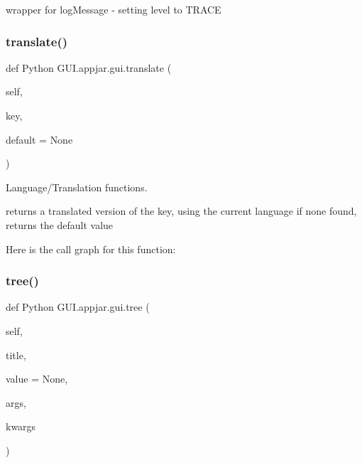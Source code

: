 \begin{DoxyVerb}
\begin{DoxyVerb}wrapper for logMessage - setting level to TRACE \end{DoxyVerb}
 \mbox{\label{class_python_01_g_u_i_1_1appjar_1_1gui_ad4fafaf0c6edbbcdee2a677608cd6fca}} 
\subsubsection{\texorpdfstring{translate()}{translate()}}
{\footnotesize\ttfamily def Python G\+U\+I.\+appjar.\+gui.\+translate (\begin{DoxyParamCaption}\item[{}]{self,  }\item[{}]{key,  }\item[{}]{default = {\ttfamily None} }\end{DoxyParamCaption})}



Language/\+Translation functions. 

\begin{DoxyVerb}returns a translated version of the key, using the current language
    if none found, returns the default value \end{DoxyVerb}
 Here is the call graph for this function\+:
\mbox{\label{class_python_01_g_u_i_1_1appjar_1_1gui_a7e54f636e5049ad8c55309dfb05303ee}} 
\subsubsection{\texorpdfstring{tree()}{tree()}}
{\footnotesize\ttfamily def Python G\+U\+I.\+appjar.\+gui.\+tree (\begin{DoxyParamCaption}\item[{}]{self,  }\item[{}]{title,  }\item[{}]{value = {\ttfamily None},  }\item[{}]{args,  }\item[{}]{kwargs }\end{DoxyParamCaption})}




\end{DoxyVerb}
